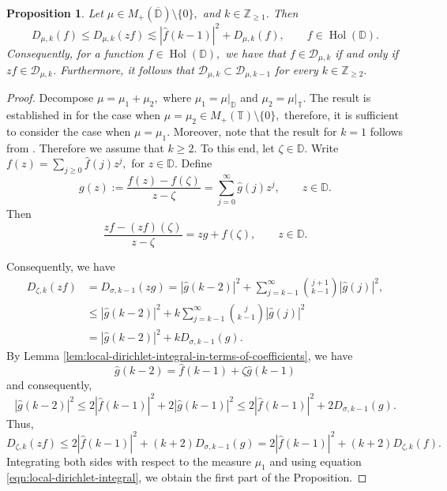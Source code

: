 \documentclass[10pt,oneside,reqno]{amsart}
\newtheorem{proposition}[theorem]{Proposition}
\theoremstyle{definition}
\theoremstyle{remark}
\newcommand{\abs}[1]{\left\lvert #1 \right\rvert}
\renewcommand{\le}{\leqslant}
\renewcommand{\ge}{\geqslant}
\newcommand{\Z}{\mathbb Z}
\newcommand{\D}{\mathbb D}
\newcommand{\T}{\mathbb T}
\numberwithin{equation}{section}
\begin{document}
\begin{proposition} \label{prop:boundedness-of-mu}
    Let $\mu \in M_{+} (\overline{\D})\setminus \{0\},$ and $k \in \Z_{\ge 1}$. Then 
    \begin{equation*}
        D_{\mu, k} (f) \le D_{\mu, k} (zf) \lesssim \abs{\hat{f} (k-1)}^2 + D_{\mu, k} (f),\qquad f\in \operatorname{Hol}(\D).
    \end{equation*}
    Consequently, for a function $f\in \operatorname{Hol} (\D),$ we have that $f \in \mathscr{D}_{\mu, k}$ if and only if $zf \in \mathscr{D}_{\mu, k}$. Furthermore, it follows that $\mathscr{D}_{\mu, k} \subset \mathscr{D}_{\mu, k-1}$ for every $k\in \mathbb Z_{\geqslant 2}.$
\end{proposition}
\begin{proof}
     Decompose $\mu=\mu_1+\mu_2,$ where $\mu_{1}= \mu|_{\D}$ and $\mu_2 = \mu|_{\T}$. The result is established in \cite[Proposition 5.7]{Rydhe19} for the case when $\mu=\mu_2 \in M_{+} (\T)\setminus \{0\},$ therefore, it is sufficient to consider the case when $\mu=\mu_1.$ Moreover, note that the result for $k=1$ follows from \cite[IV, Proposition 1.6]{1993multiplication}. Therefore we assume that $k\geqslant 2.$ To this end, let $\zeta \in \D$. Write  $f(z)= \sum_{j\geqslant 0} \hat{f}(j) z^j,$ for $z\in\D.$ Define
    \begin{equation*}
        g(z) := \frac{f(z) - f(\zeta)}{z-\zeta}= \sum_{j =0}^{\infty} \hat{g}(j) z^j, \qquad z\in \D.
    \end{equation*}
    Then
    \begin{equation*}
        \frac{zf - (zf) (\zeta)}{z-\zeta} = zg+f(\zeta), \qquad z\in \D.
    \end{equation*}
    
    Consequently, we have
    \begin{align*}
        D_{\zeta, k} (zf) & = D_{\sigma, k-1} (zg)  = \abs{\hat{g}(k-2)}^2 + \sum\limits_{j=k-1}^{\infty} \binom{j+1}{k-1} 
        \abs{\hat{g} (j)}^2,\\
        & \leqslant \abs{\hat{g}(k-2)}^2 + k \sum\limits_{j=k-1}^{\infty} \binom{j}{k-1} \abs{\hat{g} (j)}^2\\
        &= \abs{\hat{g}(k-2)}^2 + k D_{\sigma, k-1} (g).
    \end{align*}
By Lemma \ref{lem:local-dirichlet-integral-in-terms-of-coefficients}, we have
    \begin{equation*}
        \hat{g} (k-2) = \hat{f} (k-1) + \zeta\hat{g}(k-1)
    \end{equation*}
    and consequently,
    \begin{equation*}
        \abs{\hat{g} (k-2)}^{2} \le 2 \abs{\hat{f}(k-1)}^2 + 2 \abs{\hat{g} (k-1)}^{2} \leqslant  2 \abs{\hat{f}(k-1)}^2 + 2 D_{\sigma, k-1} (g).
    \end{equation*}
    Thus,
    \begin{equation*}
        D_{\zeta, k} (zf) \leqslant  2 \abs{\hat{f} (k-1)}^2 + (k+2) D_{\sigma, k-1} (g) = 2 \abs{\hat{f}(k-1)}^2 + (k+2) D_{\zeta, k} (f).
    \end{equation*}
    Integrating both sides with respect to the measure $\mu_1$ and using equation \eqref{eqn:local-dirichlet-integral}, we obtain the first part of the Proposition. 


\end{proof}
\end{document}
